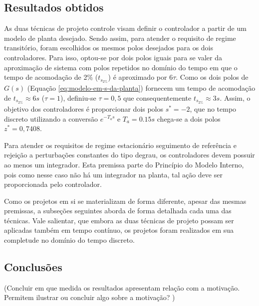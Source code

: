 \subsection{Resultados obtidos}
As duas técnicas de projeto controle visam definir o controlador a partir de um
modelo de planta desejado. Sendo assim, para atender o requisito de regime
transitório, foram escolhidos os mesmos polos desejados para os dois
controladores. Para isso, optou-se por dois polos iguais para se valer da
aproximação de sistema com polos repetidos no domínio do tempo em que o tempo de
acomodação de 2\% ($t_{s_{2\%}}$) é aproximado por $6\tau$. Como os dois polos
de $G(s)$ (Equação \ref{eq:modelo-em-s-da-planta}) fornecem um tempo de
acomodação de $t_{s_{2\%}}\approx 6s$ ($\tau = 1$), definiu-se $\tau = 0,5$ que
consequentemente $t_{s_{2\%}}\approx 3s$. Assim, o objetivo dos
controladores é proporcionar dois polos $s^*=-2$, que no tempo discreto
utilizando a conversão $e^{-T_{a}s}$ e $T_{a} = 0.15s$ chega-se a dois polos
$z^*=0,7408$.

Para atender os requisitos de regime estacionário seguimento de referência e
rejeição a perturbações constantes do tipo degrau, os controladores devem
possuir ao menos um integrador. Esta premissa parte do Princípio do Modelo
Interno, pois como nesse caso não há um integrador na planta, tal ação deve ser
proporcionada pelo controlador.

Como os projetos em si se materializam de forma diferente, apesar das mesmas
premissas, a subseções seguintes aborda de forma detalhada cada uma das
técnicas. Vale salientar, que embora as duas técnicas de projeto possam ser
aplicadas também em tempo contínuo, os projetos foram realizados em sua
completude no domínio do tempo discreto.





\subsection{Conclusões}
(Concluir em que medida os resultados apresentam relação com a motivação. Permitem ilustrar ou concluir algo sobre a motivação? )
